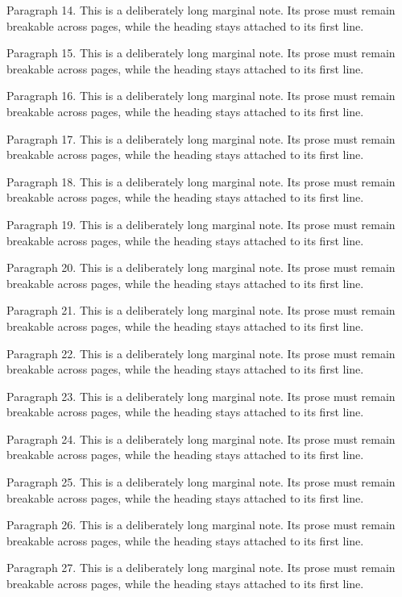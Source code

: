 \documentclass[11pt]{article}
\begin{document}
{Paragraph 14. This is a deliberately long marginal note. Its prose must remain breakable across pages, while the heading stays attached to its first line.\par
Paragraph 15. This is a deliberately long marginal note. Its prose must remain breakable across pages, while the heading stays attached to its first line.\par
Paragraph 16. This is a deliberately long marginal note. Its prose must remain breakable across pages, while the heading stays attached to its first line.\par
Paragraph 17. This is a deliberately long marginal note. Its prose must remain breakable across pages, while the heading stays attached to its first line.\par
Paragraph 18. This is a deliberately long marginal note. Its prose must remain breakable across pages, while the heading stays attached to its first line.\par
Paragraph 19. This is a deliberately long marginal note. Its prose must remain breakable across pages, while the heading stays attached to its first line.\par
Paragraph 20. This is a deliberately long marginal note. Its prose must remain breakable across pages, while the heading stays attached to its first line.\par
Paragraph 21. This is a deliberately long marginal note. Its prose must remain breakable across pages, while the heading stays attached to its first line.\par
Paragraph 22. This is a deliberately long marginal note. Its prose must remain breakable across pages, while the heading stays attached to its first line.\par
Paragraph 23. This is a deliberately long marginal note. Its prose must remain breakable across pages, while the heading stays attached to its first line.\par
Paragraph 24. This is a deliberately long marginal note. Its prose must remain breakable across pages, while the heading stays attached to its first line.\par
Paragraph 25. This is a deliberately long marginal note. Its prose must remain breakable across pages, while the heading stays attached to its first line.\par
Paragraph 26. This is a deliberately long marginal note. Its prose must remain breakable across pages, while the heading stays attached to its first line.\par
Paragraph 27. This is a deliberately long marginal note. Its prose must remain breakable across pages, while the heading stays attached to its first line.\par
}
\end{document}
